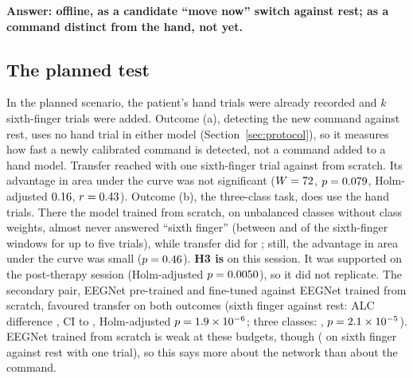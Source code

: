 \textbf{Answer: offline, as a candidate ``move now'' switch against rest; as a command
distinct from the hand, not yet.}

\subsection{The planned test}
In the planned scenario, the patient's hand trials were already recorded and $k$
sixth-finger trials were added. Outcome (a), detecting the new command against rest, uses
no hand trial in either model (Section~\ref{sec:protocol}), so it measures how fast a
newly calibrated command is detected, not a command added to a hand model. Transfer
reached \pct{\rqThreeSfRestRctTslrKOneMean} with one sixth-finger trial against
\pct{\rqThreeSfRestTsLrKOneMean} from scratch. Its advantage in area under the curve was
not significant ($W = 72$, $p = 0.079$, Holm-adjusted
$0.16$, $r = 0.43$). Outcome (b), the three-class task, does
use the hand trials. There the model trained from scratch, on unbalanced classes without
class weights, almost never answered ``sixth finger'' (between
\pct{\rqThreeRestAhSfTsLrSfRecallMin} and \pct{\rqThreeRestAhSfTsLrSfRecallMax} of the
sixth-finger windows for up to five trials), while transfer did for
\pct{\rqThreeRestAhSfRctTslrKFiveSfRecall}; still, the advantage in area under the curve
was small ($p = 0.46$). \textbf{H3 is \rqThreeHThreeACategory} on this
session. It was supported on the post-therapy session (Holm-adjusted
$p = 0.0050$), so it did not replicate. The secondary pair, EEGNet
pre-trained and fine-tuned against EEGNet trained from scratch, favoured transfer on both
outcomes (sixth finger against rest: ALC difference \rqThreeEegnetHThreeADiff, CI
\rqThreeEegnetHThreeADiffCiLo{} to \rqThreeEegnetHThreeADiffCiHi, Holm-adjusted
$p = 1.9\times10^{-6}$; three classes: \rqThreeEegnetHThreeBDiff,
$p = 2.1\times10^{-5}$). EEGNet trained from scratch is weak at these budgets,
though (\pct{\rqThreeSfRestEegnetScratchKOneMean} on sixth finger against rest with one
trial), so this says more about the network than about the command.

